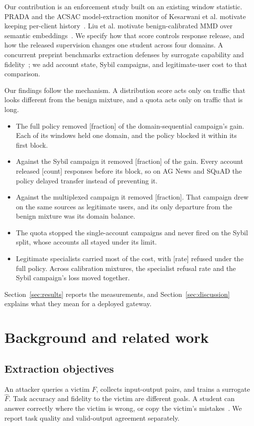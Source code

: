 \documentclass[journal]{IEEEtran}
\newcommand{\tbd}[1]{\textcolor{red!65!black}{[#1]}}
\begin{document}
Our contribution is an enforcement study built on an existing window statistic. PRADA and the ACSAC model-extraction monitor of Kesarwani et al. motivate keeping per-client history~\cite{juuti2019prada,kesarwani2018warning}. Liu et al. motivate benign-calibrated MMD over semantic embeddings~\cite{liu2026detector}. We specify how that score controls response release, and how the released supervision changes one student across four domains. A concurrent preprint benchmarks extraction defenses by surrogate capability and fidelity~\cite{liu2026lifecycle}; we add account state, Sybil campaigns, and legitimate-user cost to that comparison.

Our findings follow the mechanism. A distribution score acts only on traffic that looks different from the benign mixture, and a quota acts only on traffic that is long.
\begin{itemize}
	\item The full policy removed \tbd{fraction} of the domain-sequential campaign's gain. Each of its windows held one domain, and the policy blocked it within its first block.
	\item Against the Sybil campaign it removed \tbd{fraction} of the gain. Every account released \tbd{count} responses before its block, so on AG News and SQuAD the policy delayed transfer instead of preventing it.
	\item Against the multiplexed campaign it removed \tbd{fraction}. That campaign drew on the same sources as legitimate users, and its only departure from the benign mixture was its domain balance.
	\item The quota stopped the single-account campaigns and never fired on the Sybil split, whose accounts all stayed under its limit.
	\item Legitimate specialists carried most of the cost, with \tbd{rate} refused under the full policy. Across calibration mixtures, the specialist refusal rate and the Sybil campaign's loss moved together.
\end{itemize}
Section~\ref{sec:results} reports the measurements, and Section~\ref{sec:discussion} explains what they mean for a deployed gateway.

\section{Background and related work}
\subsection{Extraction objectives}
An attacker queries a victim $F$, collects input-output pairs, and trains a surrogate $\widehat F$. Task accuracy and fidelity to the victim are different goals. A student can answer correctly where the victim is wrong, or copy the victim's mistakes~\cite{jagielski2020high}. We report task quality and valid-output agreement separately.
\end{document}

